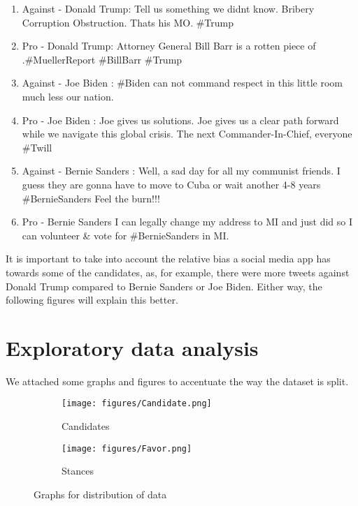 \documentclass[11pt, a4paper]{article}
\begin{document}
\begin{large}
\begin{enumerate}
    \item Against - Donald Trump: Tell us something we didnt know. Bribery Corruption Obstruction. Thats his MO. \#Trump
    \item Pro - Donald Trump: Attorney General Bill Barr is a rotten piece of .\#MuellerReport \#BillBarr \#Trump
    \item Against - Joe Biden : \#Biden can not command respect in this little room much less our nation.
    \item Pro - Joe Biden : Joe gives us solutions. Joe gives us a clear path forward while we navigate this global crisis. The next Commander-In-Chief, everyone \#Twill
    \item Against - Bernie Sanders : Well, a sad day for all my communist friends. I guess they are gonna have to move to Cuba or wait another 4-8 years \#BernieSanders Feel the burn!!!
    \item Pro - Bernie Sanders I can legally change my address to MI and just did so I can volunteer & vote for \#BernieSanders in MI.
\end{enumerate}

It is important to take into account the relative bias a social media app has towards some of the candidates, as, for example, there were more tweets against Donald Trump compared to Bernie Sanders or Joe Biden. Either way, the following figures will explain this better.

\section{Exploratory data analysis}

We attached some graphs and figures to accentuate the way the dataset is split. 

\begin{figure}
  \begin{subfigure}{.5\textwidth}
    \centering
    \texttt{[image: figures/Candidate.png]}
    \caption{Candidates}
    \label{fig:sub1}
  \end{subfigure}%
  \begin{subfigure}{.5\textwidth}
    \centering
    \texttt{[image: figures/Favor.png]}
    \caption{Stances}
    \label{fig:sub2}
  \end{subfigure}
  \caption{Graphs for distribution of data}
  \label{fig:test}
\end{figure}


\end{large}
\end{document}
